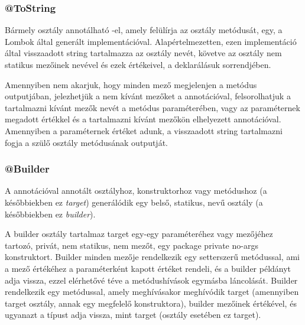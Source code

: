 
\subsubsection{@ToString}

Bármely osztály annotálható -el, amely felülírja az osztály  metódusát, egy, a Lombok által generált implementációval. Alapértelmezetten, ezen implementáció által visszaadott string tartalmazza az osztály nevét, követve az osztály nem statikus mezőinek nevével és ezek értékeivel, a deklarálásuk sorrendjében. \par

Amennyiben nem akarjuk, hogy minden mező megjelenjen a metódus outputjában, jelezhetjük a nem kívánt mezőket a  annotációval, felsorolhatjuk a tartalmazni kívánt mezők nevét a  metódus  paraméterében, vagy az  paraméternek megadott  értékkel és a tartalmazni kívánt mezőkön elhelyezett  annotációval. Amennyiben a  paraméternek  értéket adunk, a visszaadott string tartalmazni fogja a szülő osztály  metódusának outputját. \par

\subsubsection{@Builder}

A  annotációval annotált  osztályhoz, konstruktorhoz vagy metódushoz (a későbbiekben ez \emph{target}) generálódik egy belső, statikus,  nevű osztály (a későbbiekben ez \emph{builder}). \par

A builder osztály tartalmaz target egy-egy paraméteréhez vagy mezőjéhez tartozó, privát, nem statikus, nem  mezőt, egy package private no-args konstruktort. Builder minden mezője rendelkezik egy setterszerű metódussal, ami a mező értékéhez a paraméterként kapott értéket rendeli, és a builder példányt adja vissza, ezzel elérhetővé téve a metódushívások egymásba láncolását. Builder rendelkezik egy  metódussal, amely meghívásakor meghívódik target (amennyiben target osztály, annak egy megfelelő konstruktora), builder mezőinek értékével, és ugyanazt a típust adja vissza, mint target (osztály esetében ez target). \par

